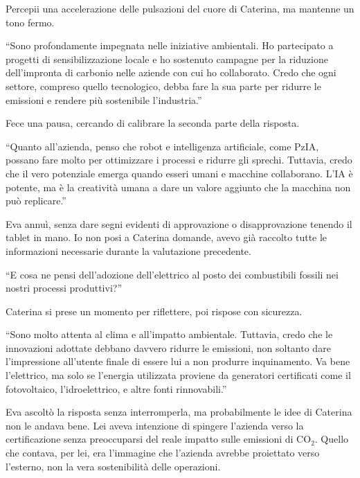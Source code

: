 Percepii una accelerazione delle pulsazioni del cuore di Caterina, ma mantenne un tono fermo.

\begin{dialogue}
 \enquote{Sono profondamente impegnata nelle iniziative ambientali. Ho partecipato a progetti di sensibilizzazione locale e ho sostenuto campagne per la riduzione dell'impronta di carbonio nelle aziende con cui ho collaborato. Credo che ogni settore, compreso quello tecnologico, debba fare la sua parte per ridurre le emissioni e rendere più sostenibile l'industria.}
\end{dialogue}

Fece una pausa, cercando di calibrare la seconda parte della risposta.

\begin{dialogue}
 \enquote{Quanto all'azienda, penso che robot e intelligenza artificiale, come PzIA, possano fare molto per ottimizzare i processi e ridurre gli sprechi. Tuttavia, credo che il vero potenziale emerga quando esseri umani e macchine collaborano. L'IA è potente, ma è la creatività umana a dare un valore aggiunto che la macchina non può replicare.}
\end{dialogue}

Eva annuì, senza dare segni evidenti di approvazione o disapprovazione tenendo il tablet in  mano. Io non posi a Caterina  domande, avevo già raccolto tutte le informazioni necessarie durante la valutazione precedente.

\begin{dialogue}
 \enquote{E cosa ne pensi dell'adozione dell'elettrico al posto dei combustibili fossili nei nostri processi produttivi?}
\end{dialogue}

Caterina si prese un momento per riflettere, poi rispose con sicurezza.

\begin{dialogue}
 \enquote{Sono molto attenta al clima e all'impatto ambientale. Tuttavia, credo che le innovazioni adottate debbano davvero ridurre le emissioni, non soltanto dare l'impressione all'utente finale di essere lui a non produrre inquinamento. Va bene l'elettrico, ma solo se l'energia utilizzata proviene da generatori certificati come il fotovoltaico, l'idroelettrico, e altre fonti rinnovabili.}
\end{dialogue}

Eva ascoltò la risposta senza interromperla, ma probabilmente le idee di Caterina  non le andava bene. Lei aveva intenzione di spingere l'azienda verso la certificazione senza preoccuparsi del reale impatto sulle emissioni di CO$_2$. Quello che contava, per lei, era l'immagine che l'azienda avrebbe proiettato verso l'esterno, non la vera sostenibilità delle operazioni.

